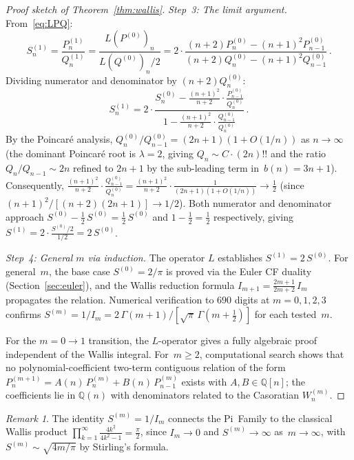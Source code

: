 \documentclass[11pt]{article}
\newcommand{\half}{\tfrac{1}{2}}
\theoremstyle{remark}
\newtheorem{remark}[theorem]{Remark}
\begin{document}
\begin{proof}[Proof sketch of Theorem~\ref{thm:wallis}]
\emph{Step~3: The limit argument.}
From~\eqref{eq:LPQ}:
\[
  S_n^{(1)} = \frac{P_n^{(1)}}{Q_n^{(1)}}
  = \frac{L(P^{(0)})_n}{L(Q^{(0)})_n / 2}
  = 2\cdot\frac{(n{+}2)P_n^{(0)} - (n{+}1)^2 P_{n-1}^{(0)}}
              {(n{+}2)Q_n^{(0)} - (n{+}1)^2 Q_{n-1}^{(0)}}\,.
\]
Dividing numerator and denominator by $(n{+}2)Q_n^{(0)}$:
\[
  S_n^{(1)} = 2\cdot
  \frac{S_n^{(0)} - \tfrac{(n+1)^2}{n+2}\cdot
    \tfrac{P_{n-1}^{(0)}}{Q_n^{(0)}}}
  {1 - \tfrac{(n+1)^2}{n+2}\cdot
    \tfrac{Q_{n-1}^{(0)}}{Q_n^{(0)}}}\,.
\]
By the Poincar\'e analysis,
$Q_n^{(0)}/Q_{n-1}^{(0)} = (2n{+}1)(1 + O(1/n))$
as $n \to \infty$ (the dominant Poincar\'e root is $\lambda = 2$,
giving $Q_n \sim C\cdot(2n)!!$ and the ratio
$Q_n/Q_{n-1} \sim 2n$ refined to $2n{+}1$ by the sub-leading
term in~$b(n) = 3n{+}1$).
Consequently,
$\tfrac{(n+1)^2}{n+2}\cdot\tfrac{Q_{n-1}^{(0)}}{Q_n^{(0)}}
= \tfrac{(n+1)^2}{n+2}\cdot\tfrac{1}{(2n{+}1)(1+O(1/n))}
\to \tfrac{1}{2}$
(since $(n{+}1)^2/[(n{+}2)(2n{+}1)] \to 1/2$).
Both numerator and denominator approach
$S^{(0)} - \frac{1}{2}\,S^{(0)} = \frac{1}{2}\,S^{(0)}$
and $1 - \frac{1}{2} = \frac{1}{2}$ respectively, giving
$S^{(1)} = 2 \cdot \frac{S^{(0)}/2}{1/2} = 2\,S^{(0)}$.

\emph{Step~4: General $m$ via induction.}
The operator $L$ establishes $S^{(1)} = 2\,S^{(0)}$.
For general~$m$, the base case $S^{(0)} = 2/\pi$ is proved
via the Euler CF duality (Section~\ref{sec:euler}),
and the Wallis reduction formula
$I_{m+1} = \frac{2m{+}1}{2m{+}2}\,I_m$
propagates the relation. Numerical verification to $690$
digits at $m=0,1,2,3$ confirms
$S^{(m)} = 1/I_m = 2\,\Gamma(m{+}1)/[\sqrt{\pi}\,
\Gamma(m{+}\half)]$ for each tested~$m$.

For the $m{=}0\to 1$ transition, the $L$\nobreakdash-operator
gives a fully algebraic proof independent of the Wallis integral.
For~$m \geq 2$, computational search shows that no polynomial-coefficient
two-term contiguous relation of the form
$P_n^{(m+1)} = A(n)\,P_n^{(m)} + B(n)\,P_{n-1}^{(m)}$ exists
with $A, B \in \mathbb{Q}[n]$; the coefficients lie in
$\mathbb{Q}(n)$ with denominators related to the Casoratian
$W_n^{(m)}$.
\end{proof}

\begin{remark}
The identity $S^{(m)} = 1/I_m$ connects the Pi~Family to the
classical Wallis product
$\prod_{k=1}^{\infty}\frac{4k^2}{4k^2-1} = \frac{\pi}{2}$,
since $I_m \to 0$ and $S^{(m)} \to \infty$ as~$m\to\infty$,
with $S^{(m)} \sim \sqrt{4m/\pi}$ by Stirling's formula.
\end{remark}
\end{document}
